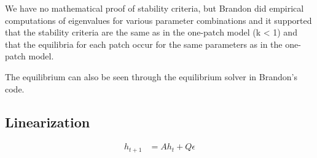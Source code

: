 \documentclass{article}
\begin{document}
We have no mathematical proof of stability criteria, but Brandon did empirical computations of eigenvalues for various parameter combinations and it supported that the stability criteria are the same as in the one-patch model (k < 1) and that the equilibria for each patch occur for the same parameters as in the one-patch model.

The equilibrium can also be seen through the equilibrium solver in Brandon's code.

\subsection{Linearization}
\begin{align}
    h_{t+1} &= A h_t + Q \epsilon
\end{align}
\end{document}
